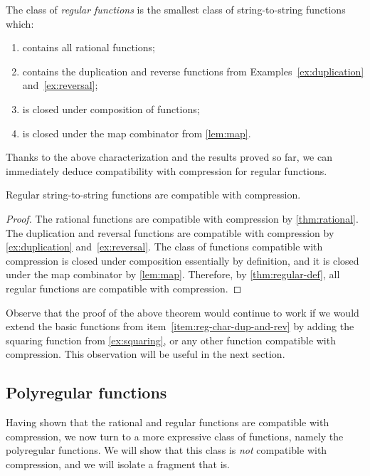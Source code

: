\documentclass[a4paper,UKenglish,cleveref, autoref, thm-restate]{lipics-v2021}
\begin{document}
\begin{theorem}\label{thm:regular-def}
    The class of \emph{regular functions} is the smallest class of string-to-string functions which: 
    \begin{enumerate}
        \item  \label{item:reg-char-rational} contains all rational functions;
        \item \label{item:reg-char-dup-and-rev} contains the duplication and reverse functions from Examples~\ref{ex:duplication} and~\ref{ex:reversal};
        \item is closed under composition of functions;
        \item \label{item:reg-char-map} is closed under the map combinator from \cref{lem:map}.
    \end{enumerate}
\end{theorem}

\noindent
Thanks to the above characterization and the results proved so far, we can immediately deduce compatibility with compression for regular functions.

\begin{theorem}
    \label{thm:regular-compatible}
    Regular string-to-string functions are compatible with compression.
\end{theorem}
\begin{proof}
    The rational functions are compatible with compression by \cref{thm:rational}. The duplication and reversal functions are compatible with compression by \cref{ex:duplication} and~\ref{ex:reversal}. The class of functions compatible with compression is closed under composition essentially by definition, and it is closed under the map combinator by \cref{lem:map}. Therefore, by \cref{thm:regular-def}, all regular functions are compatible with compression.
\end{proof}
Observe that the proof of the above theorem would continue to work if we would extend the basic functions from item~\ref{item:reg-char-dup-and-rev} by adding the  squaring function from \cref{ex:squaring}, or any other function compatible with compression. This observation will be useful in the next section. 


\subsection{Polyregular functions}
\label{sec:polyregular}

Having shown that the rational and regular functions are compatible with compression, we now turn to a more expressive class of functions, namely the polyregular functions. We will show that this class is \emph{not} compatible with compression, and we will isolate a fragment that is. 
\end{document}
